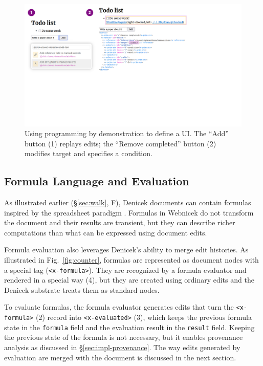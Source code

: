 \documentclass[sigconf]{acmart}
\begin{document}
\begin{figure}[t]
\includegraphics[width=1\columnwidth,clip,trim=0.5cm 8.5cm 8.5cm 0.5cm]{fig/interactive.pdf}
\caption{Using programming by demonstration to define a UI. The ``Add'' button (1) replays edits;
the ``Remove completed'' button (2) modifies target and specifies a condition. }
\label{fig:interactive}
\end{figure}


\subsection{Formula Language and Evaluation}
\label{sec:impl-eval}

As illustrated earlier (\S\ref{sec:walk}, F), Denicek documents can contain formulas inspired by the
spreadsheet paradigm \cite{nardi-1990-spreadsheets}. Formulas in Webnicek do not transform the
document and their results are transient, but they can describe richer computations than what can
be expressed using document edits.

Formula evaluation also leverages Denicek's ability to merge edit histories.
As illustrated in Fig.~\ref{fig:counter}, formulas are represented as document nodes with a
special tag ({\small\texttt{<x-formula>}}). They are recognized by a formula evaluator and
rendered in a special way (4), but they are created using ordinary
edits and the Denicek substrate treats them as standard nodes.

To evaluate formulas, the formula evaluator generates edits that turn the {\small\texttt{<x-formula>}} (2)
record into {\small\texttt{<x-evaluated>}} (3), which keeps the previous
formula state in the {\small\texttt{formula}} field and the evaluation result in the {\small\texttt{result}} field.
Keeping the previous state of the formula is not necessary, but it enables provenance analysis
as discussed in \S\ref{sec:impl-provenance}. The way edits generated by evaluation are merged
with the document is discussed in the next section.
\end{document}

